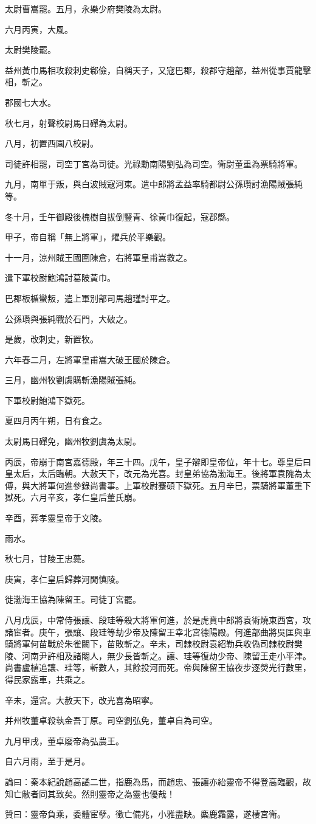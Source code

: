 \begin{pinyinscope}
太尉曹嵩罷。五月，永樂少府樊陵為太尉。

六月丙寅，大風。

太尉樊陵罷。

益州黃巾馬相攻殺刺史郗儉，自稱天子，又寇巴郡，殺郡守趙部，益州從事賈龍擊相，斬之。

郡國七大水。

秋七月，射聲校尉馬日磾為太尉。

八月，初置西園八校尉。

司徒許相罷，司空丁宮為司徒。光祿勳南陽劉弘為司空。衛尉董重為票騎將軍。

九月，南單于叛，與白波賊寇河東。遣中郎將孟益率騎都尉公孫瓚討漁陽賊張純等。

冬十月，壬午御殿後槐樹自拔倒豎青、徐黃巾復起，寇郡縣。

甲子，帝自稱「無上將軍」，燿兵於平樂觀。

十一月，涼州賊王國圍陳倉，右將軍皇甫嵩救之。

遣下軍校尉鮑鴻討葛陂黃巾。

巴郡板楯蠻叛，遣上軍別部司馬趙瑾討平之。

公孫瓚與張純戰於石門，大破之。

是歲，改刺史，新置牧。

六年春二月，左將軍皇甫嵩大破王國於陳倉。

三月，幽州牧劉虞購斬漁陽賊張純。

下軍校尉鮑鴻下獄死。

夏四月丙午朔，日有食之。

太尉馬日磾免，幽州牧劉虞為太尉。

丙辰，帝崩于南宮嘉德殿，年三十四。戊午，皇子辯即皇帝位，年十七。尊皇后曰皇太后，太后臨朝。大赦天下，改元為光喜。封皇弟協為渤海王。後將軍袁隗為太傅，與大將軍何進參錄尚書事。上軍校尉蹇碩下獄死。五月辛巳，票騎將軍董重下獄死。六月辛亥，孝仁皇后董氏崩。

辛酉，葬孝靈皇帝于文陵。

雨水。

秋七月，甘陵王忠薨。

庚寅，孝仁皇后歸葬河閒慎陵。

徙渤海王協為陳留王。司徒丁宮罷。

八月戊辰，中常侍張讓、段珪等殺大將軍何進，於是虎賁中郎將袁術燒東西宮，攻諸宦者。庚午，張讓、段珪等劫少帝及陳留王幸北宮德陽殿。何進部曲將吳匡與車騎將軍何苗戰於朱雀闕下，苗敗斬之。辛未，司隸校尉袁紹勒兵收偽司隸校尉樊陵、河南尹許相及諸閹人，無少長皆斬之。讓、珪等復劫少帝、陳留王走小平津。尚書盧植追讓、珪等，斬數人，其餘投河而死。帝與陳留王協夜步逐熒光行數里，得民家露車，共乘之。

辛未，還宮。大赦天下，改光喜為昭寧。

并州牧董卓殺執金吾丁原。司空劉弘免，董卓自為司空。

九月甲戌，董卓廢帝為弘農王。

自六月雨，至于是月。

論曰：秦本紀說趙高譎二世，指鹿為馬，而趙忠、張讓亦紿靈帝不得登高臨觀，故知亡敝者同其致矣。然則靈帝之為靈也優哉！

贊曰：靈帝負乘，委體宦孽。徵亡備兆，小雅盡缺。麋鹿霜露，遂棲宮衛。


\end{pinyinscope}
